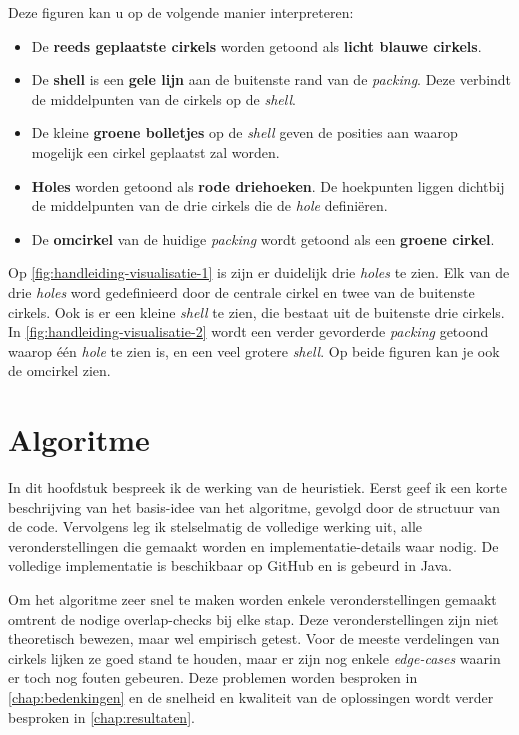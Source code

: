 \documentclass[12pt,a4paper,oneside]{book}
\begin{document}
Deze figuren kan u op de volgende manier interpreteren:

\begin{itemize}  
\item De \textbf{reeds geplaatste cirkels} worden getoond als \textbf{licht blauwe cirkels}.
\item De \textbf{shell} is een \textbf{gele lijn} aan de buitenste rand van de \textit{packing}. Deze verbindt de middelpunten van de cirkels op de \textit{shell}.
\item De kleine \textbf{groene bolletjes} op de \textit{shell} geven de posities aan waarop mogelijk een cirkel geplaatst zal worden.
\item \textbf{Holes} worden getoond als \textbf{rode driehoeken}. De hoekpunten liggen dichtbij de middelpunten van de drie cirkels die de \textit{hole} definiëren.
\item De \textbf{omcirkel} van de huidige \textit{packing} wordt getoond als een \textbf{groene cirkel}.
\end{itemize}

Op \autoref{fig:handleiding-visualisatie-1} is zijn er duidelijk drie \textit{holes} te zien.
Elk van de drie \textit{holes} word gedefinieerd door de centrale cirkel en twee van de buitenste cirkels.
Ook is er een kleine \textit{shell} te zien, die bestaat uit de buitenste drie cirkels.
In \autoref{fig:handleiding-visualisatie-2} wordt een verder gevorderde \textit{packing} getoond waarop één \textit{hole} te zien is, en een veel grotere \textit{shell}.
Op beide figuren kan je ook de omcirkel zien.

\chapter{Algoritme} \label{chap:algoritme}

In dit hoofdstuk bespreek ik de werking van de heuristiek.
Eerst geef ik een korte beschrijving van het basis-idee van het algoritme, gevolgd door de structuur van de code.
Vervolgens leg ik stelselmatig de volledige werking uit, alle veronderstellingen die gemaakt worden en implementatie-details waar nodig.
De volledige implementatie is beschikbaar op GitHub \cite{circle-packing-github} en is gebeurd in Java.

Om het algoritme zeer snel te maken worden enkele veronderstellingen gemaakt omtrent de nodige overlap-checks bij elke stap.
Deze veronderstellingen zijn niet theoretisch bewezen, maar wel empirisch getest.
Voor de meeste verdelingen van cirkels lijken ze goed stand te houden, maar er zijn nog enkele \textit{edge-cases} waarin er toch nog fouten gebeuren.
Deze problemen worden besproken in \autoref{chap:bedenkingen} en de snelheid en kwaliteit van de oplossingen wordt verder besproken in \autoref{chap:resultaten}.
\end{document}
